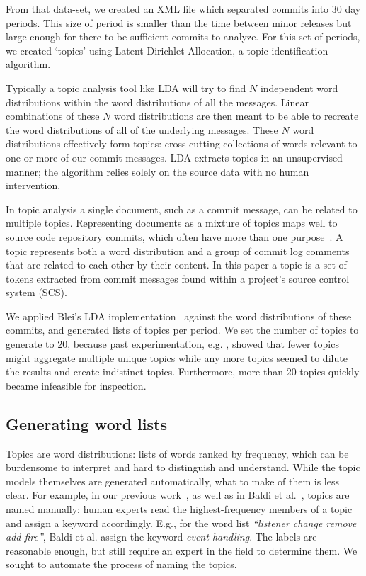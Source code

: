 \documentclass[]{sig-alternate}
\begin{document}
From that data-set, we created an XML file which separated commits into 30 day periods. This size of period is smaller than the time between minor releases but large enough for there to be sufficient commits to analyze. For this set of periods, we created `topics' using Latent Dirichlet Allocation, a topic identification algorithm. 

Typically a topic analysis tool like LDA will try to find $N$ independent word distributions within the word distributions of all the messages. Linear combinations of these $N$ word distributions are then meant to be able to recreate the word distributions of all of the underlying messages. These $N$ word distributions effectively form topics: cross-cutting collections of words relevant to one or more of our commit messages. LDA extracts topics in an unsupervised manner; the algorithm relies solely on the source data with no human intervention.

In topic analysis a single document, such as a commit message, can be related to multiple topics. Representing documents as a mixture of topics maps well to source code repository commits, which often have more than one purpose~\cite{Hindle09ICSM}.  A topic represents both a word distribution and a group of commit log comments that are related to each other by their content.  In this paper a topic is a set of tokens extracted from commit messages found within a project's source control system (SCS).

We applied Blei's LDA implementation~\cite{Blei2003} against the word distributions of these commits, and generated lists of topics per period. 
We set the number of topics to generate to $20$, because past experimentation, e.g. \cite{Hindle09ICSM}, showed that fewer topics might aggregate multiple unique topics while any more topics seemed to dilute the results and create indistinct topics. Furthermore, more than $20$ topics quickly became infeasible for inspection.

\subsection{Generating word lists}
Topics are word distributions: lists of words ranked by frequency, which can be burdensome to interpret and hard to distinguish and understand. While the topic models themselves are generated automatically, what to make of them is less clear. For example, in our previous work~\cite{Hindle09ICSM}, as well as in Baldi et al.~\cite{Baldi2008}, topics are named manually: human experts read the highest-frequency members of a topic and assign a keyword accordingly. E.g., for the word list \emph{``listener change remove add fire''}, Baldi et al. assign the keyword \emph{event-handling}. The labels are reasonable enough, but still require an expert in the field to determine them. We sought to automate the process of naming the topics.
\end{document}
